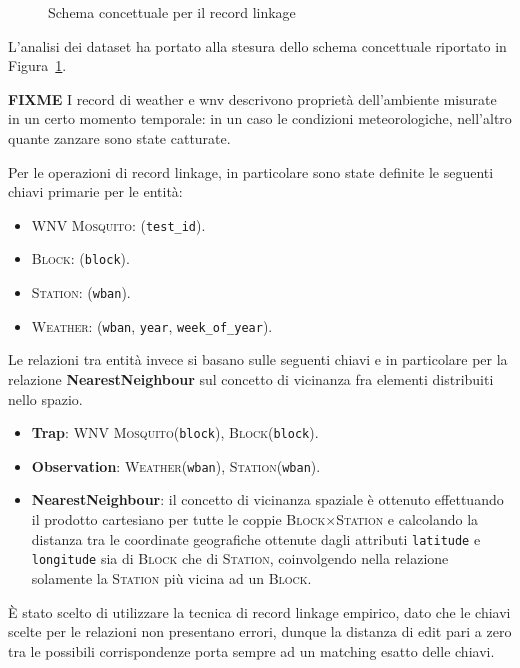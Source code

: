 \begin{figure}[H]
    \centering
    \def\svgwidth{\columnwidth}
    \scalebox{.5}{
        
    }
    \caption{Schema concettuale per il record linkage}
    \label{fig:er-schema}
\end{figure}

L'analisi dei dataset ha portato alla stesura dello schema concettuale 
riportato in Figura~\ref{fig:er-schema}. 

\textbf{FIXME} I record di weather e wnv descrivono proprietà dell'ambiente 
misurate in un certo momento temporale: in un caso le condizioni 
meteorologiche, nell'altro quante zanzare sono state catturate.

Per le operazioni di record linkage, 
in particolare sono state definite le seguenti chiavi primarie per le entità:

\begin{itemize}
    \item \textsc{WNV Mosquito}: (\texttt{test\_id}).

    \item \textsc{Block}: (\texttt{block}).
    
    \item \textsc{Station}: (\texttt{wban}).
    
    \item \textsc{Weather}: (\texttt{wban}, \texttt{year}, 
    \texttt{week\_of\_year}).

\end{itemize}


Le relazioni tra entità invece si basano sulle seguenti chiavi e in particolare 
per la relazione \textbf{NearestNeighbour} sul concetto di vicinanza fra 
elementi distribuiti nello spazio.

\begin{itemize}
    \item \textbf{Trap}: \textsc{WNV Mosquito}(\texttt{block}), 
    \textsc{Block}(\texttt{block}).

    \item \textbf{Observation}:  \textsc{Weather}(\texttt{wban}), 
    \textsc{Station}(\texttt{wban}).
    
    \item \textbf{NearestNeighbour}: il concetto di vicinanza spaziale è 
    ottenuto effettuando il prodotto cartesiano per tutte le coppie
    \textsc{Block}$\times$\textsc{Station} e calcolando la distanza tra le 
    coordinate geografiche ottenute dagli attributi \texttt{latitude} e 
    \texttt{longitude} sia di \textsc{Block} che di \textsc{Station},
    coinvolgendo nella relazione solamente la \textsc{Station} più vicina ad 
    un \textsc{Block}.

\end{itemize}

È stato scelto di utilizzare la tecnica di record linkage empirico, dato che 
le chiavi scelte per le relazioni non presentano errori, dunque la distanza di 
edit pari a zero tra le possibili corrispondenze porta sempre ad un matching 
esatto delle chiavi.
